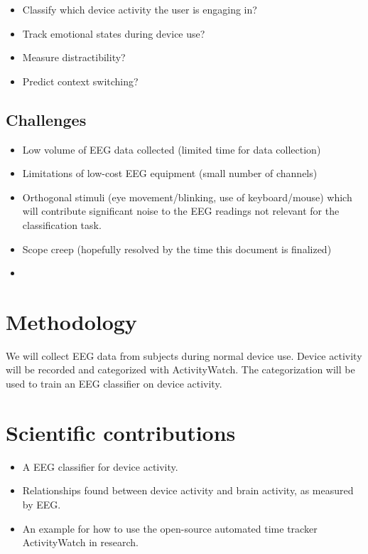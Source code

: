 \documentclass{IEEEtran}
\begin{document}
\begin{itemize}
    \item Classify which device activity the user is engaging in?
    \item Track emotional states during device use?
    \item Measure distractibility?
    \item Predict context switching?
\end{itemize}

\subsection{Challenges}

\begin{itemize}
    \item Low volume of EEG data collected (limited time for data collection)
    \item Limitations of low-cost EEG equipment (small number of channels)
    \item Orthogonal stimuli (eye movement/blinking, use of keyboard/mouse) which will contribute significant noise to the EEG readings not relevant for the classification task.
    \item Scope creep (hopefully resolved by the time this document is finalized)
    \item {}
\end{itemize}

\section{Methodology}

We will collect EEG data from subjects during normal device use. Device activity will be recorded and categorized with ActivityWatch. The categorization will be used to train an EEG classifier on device activity.

\section{Scientific contributions}

\begin{itemize}
  \item A EEG classifier for device activity.
  \item Relationships found between device activity and brain activity, as measured by EEG\@.
  \item An example for how to use the open-source automated time tracker ActivityWatch in research.
\end{itemize}
\end{document}

